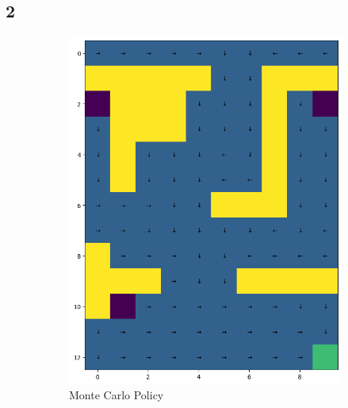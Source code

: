 \subsection*{2}
\begin{figure}[H]
    \centering
    \begin{subfigure}[b]{0.4\textwidth}
        \centering
        \includegraphics[width=\textwidth]{assets/mc/mc_policy.png}        
        \caption{Monte Carlo Policy}
    \end{subfigure}
    \hfill 
    \begin{subfigure}[b]{0.4\textwidth}
        \centering

\end{subfigure}
\end{figure}
